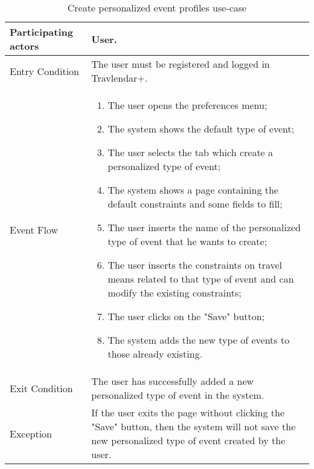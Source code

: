 \begin{table}[H]
	\begin{center}
		\begin{tabular}{ | p{} | p{} | }
		\hline
		Participating actors & User.\\
		\hline
		Entry Condition & The user must be registered and logged in Travlendar+.\\
		\hline
		Event Flow & 
			\begin{enumerate}
				\item The user opens the preferences menu;
				\item The system shows the default type of event;
				\item The user selects the tab which create a personalized type of event;
				\item The system shows a page containing the default constraints and some fields to fill;
				\item The user inserts the name of the personalized type of event that he wants to create;
				\item The user inserts the constraints on travel means related to that type of event and can modify the existing constraints;				
				\item The user clicks on the "Save" button;
				\item The system adds the new type of events to those already existing.

			\end{enumerate} \\
		\hline
		Exit Condition & The user has successfully added a new personalized type of event in the system.\\
		\hline
		Exception & If the user exits the page without clicking the "Save" button, then the system will not save the new personalized type of event created by the user.\\ 
		\hline
		\end{tabular}
	\end{center}
	\caption{Create personalized event profiles use-case}
\end{table}